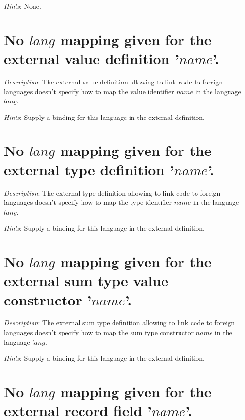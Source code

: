 {\em Hints}: None.



\section*{No $lang$ mapping given for the external value definition
  '$name$'.}

{\em Description}: The external value definition allowing to link
{\focal} code to foreign languages doesn't specify how to map the value
identifier $name$ in the language $lang$.

{\em Hints}: Supply a binding for this language in the external
definition.



\section*{No $lang$ mapping given for the external type definition
  '$name$'.}

{\em Description}: The external type definition allowing to link
{\focal} code to foreign languages doesn't specify how to map the type
identifier $name$ in the language $lang$.

{\em Hints}: Supply a binding for this language in the external
definition.



\section*{No $lang$ mapping given for the external sum type value
  constructor '$name$'.}

{\em Description}: The external sum type definition allowing to link
{\focal} code to foreign languages doesn't specify how to map the sum
type constructor $name$ in the language $lang$.

{\em Hints}: Supply a binding for this language in the external
definition.



\section*{No $lang$ mapping given for the external record field
  '$name$'.}

